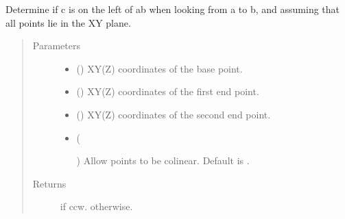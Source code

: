 \documentclass[letterpaper,10pt,english]{sphinxmanual}
\begin{document}
\begin{fulllineitems}
\label{\detokenize{cockatoo:cockatoo.utilities.is_ccw_xy}}
Determine if c is on the left of ab when looking from a to b,
and assuming that all points lie in the XY plane.
\begin{quote}\begin{description}
\item[{Parameters}] \leavevmode\begin{itemize}
\item {} 
 () \textendash{} XY(Z) coordinates of the base point.

\item {} 
 () \textendash{} XY(Z) coordinates of the first end point.

\item {} 
 () \textendash{} XY(Z) coordinates of the second end point.

\item {} 
 (%
\begin{footnote}[62]\sphinxAtStartFootnote
{}
%
\end{footnote}\sphinxstyleliteralemphasis{\sphinxupquote{, }}) \textendash{} Allow points to be colinear.
Default is .

\end{itemize}

\item[{Returns}] \leavevmode
{} \textendash{}  if ccw.
 otherwise.

\end{description}\end{quote}

\end{fulllineitems}
\end{document}

